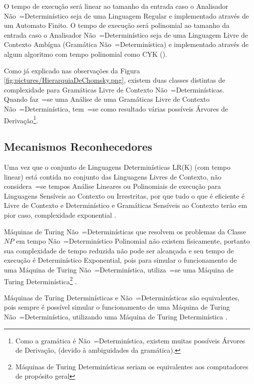 {    O tempo de execução será linear ao tamanho da entrada caso o Analisador Não~=Determinístico seja de uma Linguagem Regular e
    implementado através de um Automato Finito.
    O tempo de execução será polinomial ao tamanho da entrada caso o Analisador Não~=Determinístico seja de uma Linguagem Livre de Contexto Ambígua (Gramática Não~=Determinística) e
    implementado através de algum algoritmo com tempo polinomial como CYK ().

    Como já explicado nas observações da Figura \ref{fig:pictures/HierarquiaDeChomsky.png},
    existem duas classes distintas de complexidade para Gramáticas Livre de Contexto Não~=Determinísticas.
    Quando faz~=se uma Análise de uma Gramáticas Livre de Contexto Não~=Determinística,
    tem~=se como resultado várias possíveis Árvores de Derivação\footnote{
    Como a gramática é Não~=Determinística,
    existem muitas possíveis Árvores de Derivação,
    (devido à ambiguidades da gramática).
    }.


\subsection{Mecanismos Reconhecedores}
\label{mecanismosReconhecedores}

    Uma vez que o conjunto de Linguagens Determinísticas LR(K) (com tempo linear) está contida no conjunto das Linguagens Livres de Contexto,
    não considera~=se tempos Análise Lineares ou
    Polinomiais de execução para Linguagens Sensíveis ao Contexto ou
    Irrestritas,
    por que tudo o que é eficiente é Livre de Contexto e
    Determinístico e
    Gramáticas Sensíveis ao Contexto terão em pior caso,
    complexidade exponential \cite{growingContextSensitiveLanguages}.

    Máquinas de Turing Não~=Determinísticas que resolvem os problemas da Classe $NP$ em tempo Não~=Determinístico Polinomial não existem fisicamente,
    portanto sua complexidade de tempo reduzida não pode ser alcançada e
    seu tempo de execução é Determinístico Exponential,
    pois para simular o funcionamento de uma Máquina de Turing Não~=Determinística,
    utiliza~=se uma Máquina de Turing Determinística\footnote{
    Máquinas de Turing Determinísticas seriam os equivalentes aos computadores de propósito geral
    }
    \cite{sipserBook,turingMachinesRoyer}.

    Máquinas de Turing Determinísticas e
    Não~=Determinísticas são equivalentes,
    pois sempre é possível simular o funcionamento de uma Máquina de Turing Não~=Determinística,
    utilizando uma Máquina de Turing Determinística \cite{hopcroftBook}.

}
